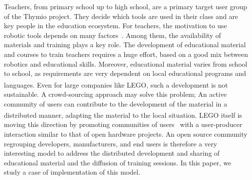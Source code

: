 \documentclass[letterpaper, 10 pt, conference]{ieeeconf}  %
\begin{document}
Teachers, from primary school up to high school, are a primary target user group of the Thymio project.
They decide which tools are used in their class and are key people in the education ecosystem.
For teachers, the motivation to use robotic tools depends on many factors~\cite{chevalier2016}.
Among them, the availability of materials and training plays a key role.
The development of educational material and courses to train teachers requires a huge effort, based on a good mix between robotics and educational skills. 
Moreover, educational material varies from school to school, as requirements are very dependent on local educational programs and languages. 
Even for large companies like LEGO\textsuperscript{\textregistered}, such a development is not sustainable. 
A crowd-sourcing approach may solve this problem; An active community of users can contribute to the development of the material in a distributed manner, adapting the material to the local situation.
LEGO\textsuperscript{\textregistered} itself is moving this direction by promoting communities of users~\cite{Hienerth2014} with a user-producer interaction similar to that of open hardware projects.
An open source community regrouping developers, manufacturers, and end users is therefore a very interesting model to address the distributed development and sharing of educational material and the diffusion of training sessions.
In this paper, we study a case of implementation of this model.
\end{document}
